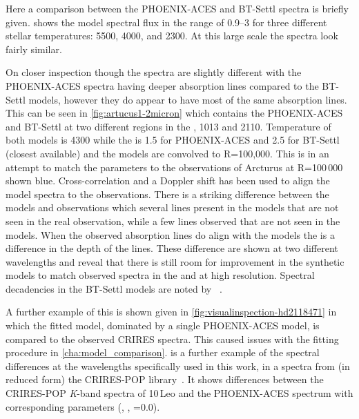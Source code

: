 Here a comparison between the {PHOENIX-ACES} and {BT-Settl} spectra is briefly given.
 shows the model spectral flux in the \nir{} range of 0.9--3\um{} for three different stellar temperatures: 5500, 4000, and 2300\K{}.
At this large scale the spectra look fairly similar.

On closer inspection though the spectra are slightly different with the {PHOENIX-ACES} spectra having deeper absorption lines compared to the {BT-Settl} models, however they do appear to have most of the same absorption lines.
This can be seen in \cref{fig:artucus1-2micron} which contains the {PHOENIX-ACES} and {BT-Settl} at two different regions in the \nir, 1013\nm{} and 2110\nm{}.
Temperature of both models is 4300\K{} while the \logg{} is 1.5 for {PHOENIX-ACES} and 2.5 for {BT-Settl} (closest available) and the models are convolved to R=100,000.
This is in an attempt to match the parameters to the observations of {Arcturus} at R=100\,000 shown blue.
Cross-correlation and a Doppler shift has been used to align the model spectra to the observations.
There is a striking difference between the models and observations which several lines present in the models that are not seen in the real observation, while a few lines observed that are not seen in the models.
When the observed absorption lines do align with the models the is a difference in the depth of the lines.
These difference are shown at two different wavelengths and reveal that there is still room for improvement in the synthetic models to match observed spectra in the \nir{} and at high resolution.
Spectral decadencies in the {BT-Settl} models are noted by ~\citet{rajpurohit_effective_2013}.


A further example of this is shown given in \cref{fig:visualinspection-hd2118471} in which the fitted model, dominated by a single {PHOENIX-ACES} model, is compared to the observed {CRIRES} spectra.
This caused issues with the fitting procedure in \cref{cha:model_comparison}.
 is a further example of the spectral differences at the \nir{} wavelengths specifically used in this work, in a spectra from (in reduced form) the CRIRES-POP library~\citep{lebzelter_crirespop_2012,nicholls_crirespop_2017}.
It shows differences between the CRIRES-POP \emph{K}-band spectra of {10\,Leo} and the {PHOENIX-ACES} spectrum with corresponding parameters (, , \feh{}=0.0).


